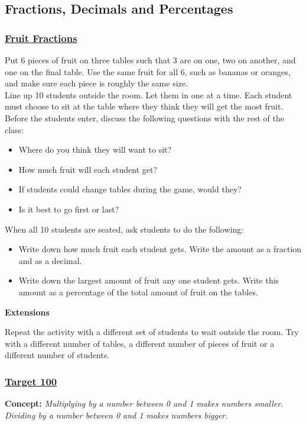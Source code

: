 	\subsection{Fractions, Decimals and Percentages} \label{classactsfracsdecs}
	 
		\subsubsection{\underline{Fruit Fractions}}
		Put 6 pieces of fruit on three tables such that 3 are on one, two on another, and one on the final table. Use the same fruit for all 6, such as bananas or oranges, and make sure each piece is roughly the same size.\\
		
		\noindent Line up 10 students  outside the room. Let them in one at a time. Each student must choose to sit at the table where they think they will get the most fruit.\\
		
		\noindent Before the students enter, discuss the following questions with the rest of the class:
		\begin{itemize}
		
		\item Where do you think they will want to sit?
		\item How much fruit will each student get?
		\item If students could change tables during the game, would they?
		\item Is it best to go first or last?						\end{itemize}
	When all 10 students are seated, ask students to do the following:
	\begin{itemize}
	\item Write down how much fruit each student gets. Write the amount as a fraction and as a decimal.
	\item Write down the largest amount of fruit any one student gets. Write this amount as a percentage of the total amount of fruit on the tables.
	\end{itemize}
	
	\noindent \textbf{Extensions}
		
	\noindent Repeat the activity with a different set of students to wait outside the room. Try with a different number of tables, a different number of pieces of fruit or a different number of students.
	
		\subsubsection{\underline{Target 100}}	
		\textbf{Concept:} \emph{Multiplying by a number between 0 and 1 makes numbers smaller. Dividing by a number between 0 and 1 makes numbers bigger.}\\
		
